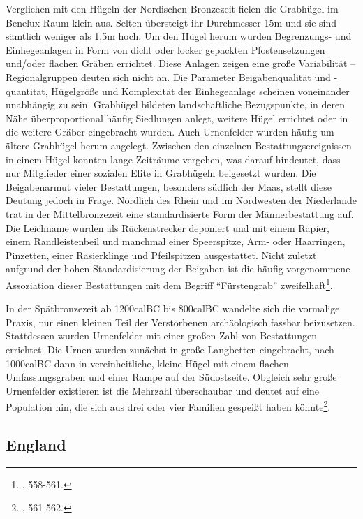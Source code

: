\documentclass[openany,twoside,twocolumn]{book}
\let\rmarkdownfootnote\footnote%
\def\footnote{\protect\rmarkdownfootnote}
\begin{document}
Verglichen mit den Hügeln der Nordischen Bronzezeit fielen die Grabhügel
im Benelux Raum klein aus. Selten übersteigt ihr Durchmesser 15m und sie
sind sämtlich weniger als 1,5m hoch. Um den Hügel herum wurden
Begrenzungs- und Einhegeanlagen in Form von dicht oder locker gepackten
Pfostensetzungen und/oder flachen Gräben errichtet. Diese Anlagen zeigen
eine große Variabilität -- Regionalgruppen deuten sich nicht an. Die
Parameter Beigabenqualität und -quantität, Hügelgröße und Komplexität
der Einhegeanlage scheinen voneinander unabhängig zu sein. Grabhügel
bildeten landschaftliche Bezugspunkte, in deren Nähe überproportional
häufig Siedlungen anlegt, weitere Hügel errichtet oder in die weitere
Gräber eingebracht wurden. Auch Urnenfelder wurden häufig um ältere
Grabhügel herum angelegt. Zwischen den einzelnen Bestattungsereignissen
in einem Hügel konnten lange Zeiträume vergehen, was darauf hindeutet,
dass nur Mitglieder einer sozialen Elite in Grabhügeln beigesetzt
wurden. Die Beigabenarmut vieler Bestattungen, besonders südlich der
Maas, stellt diese Deutung jedoch in Frage. Nördlich des Rhein und im
Nordwesten der Niederlande trat in der Mittelbronzezeit eine
standardisierte Form der Männerbestattung auf. Die Leichname wurden als
Rückenstrecker deponiert und mit einem Rapier, einem Randleistenbeil und
manchmal einer Speerspitze, Arm- oder Haarringen, Pinzetten, einer
Rasierklinge und Pfeilspitzen ausgestattet. Nicht zuletzt aufgrund der
hohen Standardisierung der Beigaben ist die häufig vorgenommene
Assoziation dieser Bestattungen mit dem Begriff ``Fürstengrab''
zweifelhaft\footnote{\textcite{fokkens_bronze_2013}, 558-561.}.

In der Spätbronzezeit ab 1200calBC bis 800calBC wandelte sich die
vormalige Praxis, nur einen kleinen Teil der Verstorbenen archäologisch
fassbar beizusetzen. Stattdessen wurden Urnenfelder mit einer großen
Zahl von Bestattungen errichtet. Die Urnen wurden zunächst in große
Langbetten eingebracht, nach 1000calBC dann in vereinheitliche, kleine
Hügel mit einem flachen Umfassungsgraben und einer Rampe auf der
Südostseite. Obgleich sehr große Urnenfelder existieren ist die Mehrzahl
überschaubar und deutet auf eine Population hin, die sich aus drei oder
vier Familien gespeißt haben könnte\footnote{\textcite{fokkens_bronze_2013},
  561-562.}.

\hypertarget{england}{%
\subsection{England}\label{england}}
\end{document}
